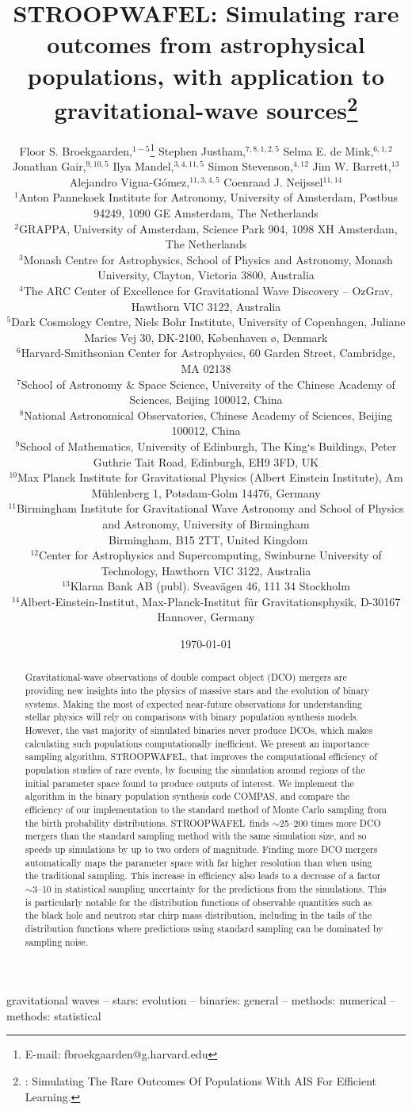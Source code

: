 \documentclass[a4paper,fleqn,usenatbib,useAMS,usedcolumn]{mnras}
\title[STROOPWAFEL: Simulating rare events]{STROOPWAFEL: Simulating rare outcomes from astrophysical populations,
 with application to gravitational-wave sources{\thanks{\AISs: Simulating The Rare Outcomes Of Populations With AIS For Efficient Learning.}}} %
\author[Broekgaarden et al.]
{Floor S. Broekgaarden,$^{1-5}${\thanks{E-mail: fbroekgaarden@g.harvard.edu} }
Stephen Justham,$^{7,8,1,2,5}$
Selma E. de Mink,$^{6,1,2}$
\newauthor
Jonathan Gair,$^{9,10,5}$
Ilya Mandel,$^{3,4,11,5}$
Simon Stevenson,$^{4,12}$
\newauthor
Jim W. Barrett,$^{13}$
Alejandro Vigna-G\'{o}mez,$^{11,3,4,5}$
Coenraad J. Neijssel$^{11,14}$
\\
$^{1}$Anton Pannekoek Institute for Astronomy, University of Amsterdam, Postbus 94249, 1090 GE Amsterdam, The Netherlands \\
$^{2}$GRAPPA, University of Amsterdam, Science Park 904, 1098 XH Amsterdam, The
Netherlands \\
$^{3}$Monash Centre for Astrophysics, School of Physics and Astronomy, Monash University, Clayton, Victoria 3800, Australia\\
$^{4}$The ARC Center of Excellence for Gravitational Wave Discovery -- OzGrav, Hawthorn VIC 3122, Australia\\
$^{5}$Dark Cosmology Centre, Niels Bohr Institute, University of
Copenhagen, Juliane Maries Vej 30, DK-2100, K\o benhaven \o, Denmark \\
$^{6}$Harvard-Smithsonian Center for Astrophysics, 60 Garden  Street,  Cambridge, MA 02138 \\
$^{7}$School of Astronomy $\&$ Space Science, University of the Chinese Academy of Sciences, Beijing 100012, China\\
$^{8}$National Astronomical Observatories, Chinese Academy of Sciences, Beijing 100012, China\\
$^{9}$School of Mathematics, University of Edinburgh, The King`s Buildings, Peter
Guthrie Tait Road, Edinburgh, EH9 3FD, UK\\
$^{10}$Max Planck Institute for Gravitational Physics (Albert Einstein Institute), Am M\"{u}hlenberg 1, Potsdam-Golm 14476, Germany\\
$^{11}$Birmingham Institute for Gravitational Wave Astronomy and School of Physics and Astronomy, University of Birmingham \\ 
$^{}$ Birmingham, B15 2TT, United Kingdom\\
$^{12}$Center for Astrophysics and Supercomputing, Swinburne University of Technology, Hawthorn VIC 3122, Australia\\
$^{13}$Klarna Bank AB (publ). Sveav\"{a}gen 46, 111 34 Stockholm\\
$^{14}$Albert-Einstein-Institut, Max-Planck-Institut f\"{u}r Gravitationsphysik, D-30167 Hannover, Germany 
}
\date{\today}
\newcommand{\AISs}{\textsc{STROOPWAFEL}}
\begin{document}
\normalem

\label{firstpage}
\pagerange{\pageref{firstpage}--\pageref{lastpage}}
\maketitle

\begin{abstract} 
Gravitational-wave observations of double compact object (DCO) mergers are providing new insights into the physics of massive stars and the evolution of binary systems. Making the most of expected near-future observations for understanding stellar physics will rely on comparisons with binary population synthesis models.  
However,  the vast majority of simulated binaries never produce DCOs, which makes calculating such populations computationally inefficient.
We present an importance sampling algorithm, \AISs, that improves the computational efficiency of population studies of rare events, by focusing the simulation around regions of the initial parameter space found to produce outputs of interest.
We implement the algorithm in the binary population synthesis code COMPAS, and compare the efficiency of our implementation to the standard method of Monte Carlo sampling from the birth probability distributions. 
\AISs \ finds $\sim$25--200 times more DCO mergers than the standard sampling method with the same simulation size, and so speeds up simulations by up to two orders of magnitude. Finding more DCO mergers automatically maps the parameter space with far higher resolution than when using the traditional sampling. 
This increase in efficiency also leads to a decrease of a factor $\sim$3--10  in statistical sampling uncertainty for the predictions from the simulations. 
This is particularly notable for the distribution functions of observable quantities such as the black hole and neutron star chirp mass distribution, including in the tails of the distribution functions where predictions using standard sampling can be dominated by sampling noise.  
\href{https://doi.org/10.5281/zenodo.3387651}{\color{linkcolor}\faBook}
\end{abstract}

\begin{keywords}
gravitational waves --  stars: evolution -- binaries: general  -- methods: numerical -- methods: statistical 
\end{keywords}
\end{document}
